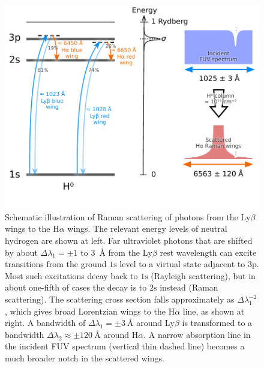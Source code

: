 \documentclass[times]{aastex63}
\newcommand\Config[1]{\ensuremath{\mathrm{#1}}}
\newcommand\ha{\ensuremath{\text{H}\alpha}}
\newcommand\lyb{\ensuremath{\text{Ly}\beta}}
\begin{document}
\begin{figure}
  \centering
  \includegraphics[width=0.8\linewidth]{figs/raman-cartoon}
  \caption{Schematic illustration of Raman scattering of photons from
    the \lyb{} wings to the \ha{} wings.  The relevant energy levels
    of neutral hydrogen are shown at left.  Far ultraviolet photons
    that are shifted by about \(\Delta\lambda_1 = \pm 1\) to \SI{3}{\angstrom}
    from the \lyb{} rest wavelength can excite transitions from the
    ground \Config{1s} level to a virtual state adjacent to
    \Config{3p}.  Most such excitations decay back to \Config{1s}
    (Rayleigh scattering), but in about one-fifth of cases the decay
    is to \Config{2s} instead (Raman scattering).  The scattering
    cross section falls approximately as \(\Delta\lambda_1^{-2}\), which gives
    broad Lorentzian wings to the \ha{} line, as shown at right. A
    bandwidth of \(\Delta\lambda_1 = \pm \SI{3}{\angstrom}\) around \lyb{} is
    transformed to a bandwidth
    \(\Delta\lambda_2 \approx \pm \SI{120}{\angstrom}\) around \ha{}.  A narrow
    absorption line in the incident FUV spectrum (vertical thin dashed
    line) becomes a much broader notch in the scattered wings. }
  \label{fig:raman-cartoon}
\end{figure}
\end{document}
